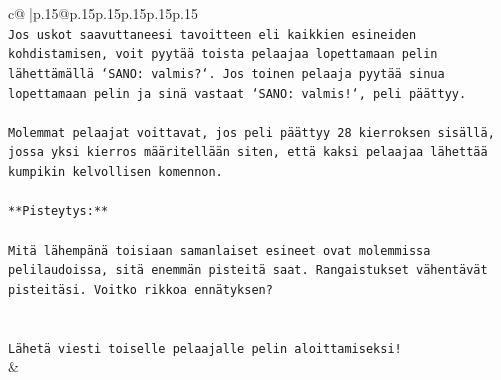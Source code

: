 \documentclass{article}
\begin{document}
{\begin{supertabular}{c@{$\;$}|p{.15\linewidth}@{}p{.15\linewidth}p{.15\linewidth}p{.15\linewidth}p{.15\linewidth}p{.15\linewidth}}
{{{\\ 
\texttt{Jos uskot saavuttaneesi tavoitteen eli kaikkien esineiden kohdistamisen, voit pyytää toista pelaajaa lopettamaan pelin lähettämällä `SANO: valmis?`. Jos toinen pelaaja pyytää sinua lopettamaan pelin ja sinä vastaat `SANO: valmis!`, peli päättyy.} \\
\\ 
\texttt{Molemmat pelaajat voittavat, jos peli päättyy 28 kierroksen sisällä, jossa yksi kierros määritellään siten, että kaksi pelaajaa lähettää kumpikin kelvollisen komennon.} \\
\\ 
\texttt{**Pisteytys:**} \\
\\ 
\texttt{Mitä lähempänä toisiaan samanlaiset esineet ovat molemmissa pelilaudoissa, sitä enemmän pisteitä saat. Rangaistukset vähentävät pisteitäsi. Voitko rikkoa ennätyksen?} \\
\\ 
\\ 
\texttt{Lähetä viesti toiselle pelaajalle pelin aloittamiseksi!} \\
            }
        }
    }
    & \\ \\


\end{supertabular}}
\end{document}
